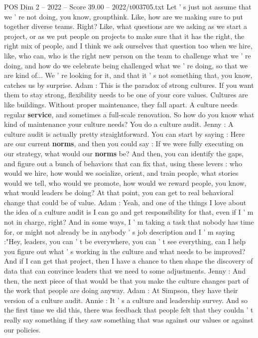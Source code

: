 \begin{textsample}{POS Dim 2 – 2022 – Score 39.00 – 2022/t003705.txt}
Let ' s just not assume that we ' re not doing, you know, groupthink.
Like, how are we making sure to put together diverse teams.
Right?
Like, what questions are we asking as we start a project, or as we put people on projects to make sure that it has the right, the right mix of people, and I think we ask ourselves that question too when we hire, like, who can, who is the right new person on the team to challenge what we ' re doing, and how do we celebrate being challenged what we ' re doing, so that we are kind of...
We ' re looking for it, and that it ' s not something that, you know, catches us by surprise.
Adam : This is the paradox of strong cultures.
If you want them to stay strong, flexibility needs to be one of your core values.
Cultures are like buildings.
Without proper maintenance, they fall apart.
A culture needs regular \textbf{service}, and sometimes a full-scale renovation.
So how do you know what kind of maintenance your culture needs?
You do a culture audit.
Jenny : A culture audit is actually pretty straightforward.
You can start by saying : Here are our current \textbf{norms}, and then you could say : If we were fully executing on our strategy, what would our \textbf{norms} be?
And then, you can identify the gaps, and figure out a bunch of behaviors that can fix that, using these levers : who would we hire, how would we socialize, orient, and train people, what stories would we tell, who would we promote, how would we reward people, you know, what would leaders be doing?
At that point, you can get to real behavioral change that could be of value.
Adam : Yeah, and one of the things I love about the idea of a culture audit is I can go and get responsibility for that, even if I ' m not in charge, right?
And in some ways, I ' m taking a task that nobody has time for, or might not already be in anybody ' s job description and I ' m saying :"Hey, leaders, you can ' t be everywhere, you can ' t see everything, can I help you figure out what ' s working in the culture and what needs to be improved?
And if I can get that project, then I have a chance to then shape the discovery of data that can convince leaders that we need to some adjustments.
Jenny : And then, the next piece of that would be that you make the culture changes part of the work that people are doing anyway.
Adam : At Simpson, they have their version of a culture audit.
Annie : It ' s a culture and leadership survey.
And so the first time we did this, there was feedback that people felt that they couldn ' t really say something if they saw something that was against our values or against our policies.

\end{textsample}
